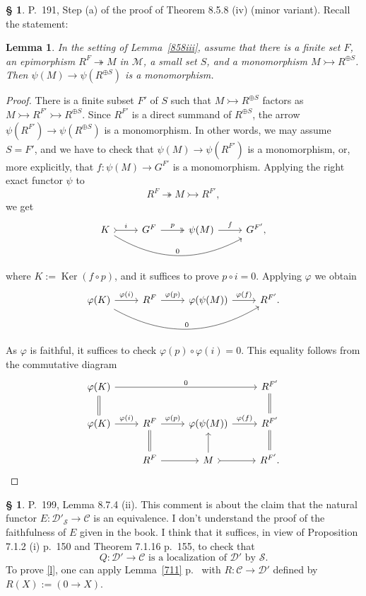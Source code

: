 \documentclass[12pt]{article}
\newtheorem{lem}[thm]{Lemma}
\theoremstyle{remark}
\theoremstyle{definition}
\newtheorem{s}[thm]{\S}
\newcommand{\cc}{\mathcal}
\newcommand{\C}{\mathcal C}
\newcommand{\M}{\mathcal M}
\newcommand{\epi}{\twoheadrightarrow}
\newcommand{\mv}{ (minor variant)}
\DeclareMathOperator{\Ker}{Ker}
\begin{document}
%
%
\begin{s} 
P.~191, Step (a) of the proof of Theorem 8.5.8 (iv)\mv. Recall the statement: 
%
\begin{lem}
%
In the setting of Lemma~\ref{858iii}, assume that there is a finite set $F$, an epimorphism $R^F\epi M$ in $\M$, a small set $S$, and a monomorphism $M\rightarrowtail R^{\oplus S}$. Then $\psi(M)\to\psi(R^{\oplus S})$ is a monomorphism. 
%
\end{lem}
%
\begin{proof}
There is a finite subset $F'$ of $S$ such that $M\rightarrowtail R^{\oplus S}$ factors as $M\rightarrowtail R^{F'}\rightarrowtail R^{\oplus S}$. Since $R^{F'}$ is a direct summand of $R^{\oplus S}$, the arrow $\psi(R^{F'})\to\psi(R^{\oplus S})$ is a monomorphism. In other words, we may assume $S=F'$, and we have to check that $\psi(M)\to\psi(R^{F'})$ is a monomorphism, or, more explicitly, that $f:\psi(M)\to G^{F'}$ is a monomorphism. Applying the right exact functor $\psi$ to 
$$
R^F\epi M\rightarrowtail R^{F'},
$$
we get 
$$
\begin{tikzcd}
K\ar[tail]{r}{i}\ar[bend right]{rrr}{0}&G^F\ar[two heads]{r}{p}&\psi(M)\ar{r}{f}&G^{F'},
\end{tikzcd}
$$
where $K:=\Ker(f\circ p)$, and it suffices to prove $p\circ i=0$. Applying $\varphi$ we obtain
$$
\begin{tikzcd}
\varphi(K)\ar{r}{\varphi(i)}\ar[bend right]{rrr}{0}&R^F\ar{r}{\varphi(p)}&\varphi(\psi(M))\ar{r}{\varphi(f)}&R^{F'}.
\end{tikzcd}
$$
As $\varphi$ is faithful, it suffices to check $\varphi(p)\circ\varphi(i)=0$. This equality follows from the commutative diagram
$$
\begin{tikzcd}
\varphi(K)\ar[equal]{d}\ar{rrr}{0}&&&R^{F'}\ar[equal]{d}\\
\varphi(K)\ar{r}{\varphi(i)}&R^F\ar[equal]{d}\ar{r}{\varphi(p)}&\varphi(\psi(M))\ar{r}{\varphi(f)}&R^{F'}\ar[equal]{d}\\
&R^F\ar{r}&M\ar[tail]{r}\ar{u}&R^{F'}.
\end{tikzcd}
$$
\end{proof}
\end{s}
%
%
\begin{s}
P.~199, Lemma 8.7.4 (ii). This comment is about the claim that the natural functor $E:\cc D'_{\cc S}\to\C$ is an equivalence. I don't understand the proof of the faithfulness of $E$ given in the book. I think that it suffices, in view of Proposition 7.1.2 (i) p.~150 and Theorem 7.1.16 p.~155, to check that
%
\begin{equation}\label{l}
Q:\cc D'\to\C\text{ is a localization of }\cc D'\text{ by }\cc S.
\end{equation}
%
To prove \eqref{l}, one can apply Lemma~\ref{711} p.~\pageref{711} with $R:\C\to\cc D'$ defined by $R(X):=(0\to X)$.
\end{s}
\end{document}
